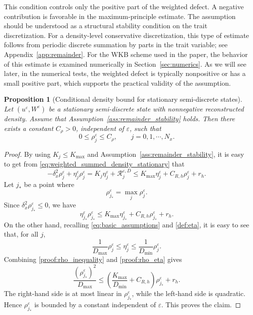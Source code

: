 \documentclass[11pt]{article}
\newtheorem{proposition}{Proposition}[section]
\begin{document}
This condition controls only the positive part of the weighted defect.  A
negative contribution is favorable in the maximum-principle estimate.  The
assumption should be understood as a structural stability condition on the trait
discretization.  For a density-level conservative discretization, this type of
estimate follows from periodic discrete summation by parts in the trait
variable; see Appendix~\ref{app:remainder}.  
For the WKB scheme used in the paper,  the behavior of this estimate is examined numerically in
Section~\ref{sec:numerics}.  
As we will see later, in the numerical tests, the weighted defect is
typically nonpositive or has a small positive part, which supports the practical
validity of the assumption.



\begin{proposition}[Conditional density bound for stationary semi-discrete states]
\label{prop:uniform_bound_stationary_mass}
Let \((u^\varepsilon,W^\varepsilon)\) be a stationary semi-discrete state with
nonnegative reconstructed density.  Assume that
Assumption~\ref{ass:remainder_stability} holds.  Then there exists a constant
\(C_\rho>0\), independent of \(\varepsilon\), such that
\[
    0\le \rho_j^\varepsilon\le C_\rho,
    \qquad j=0, 1,\cdots, N_x .
\]
\end{proposition}

\begin{proof}
By using  \(K_j\le K_{\max}\) and Assumption~\ref{ass:remainder_stability}, it is easy to get from \eqref{eq:weighted_summed_density_stationary} that 
\[
    -\delta_x^2\rho_j^\varepsilon
    +
    \eta_j^\varepsilon\rho_j^\varepsilon
    =
    K_j  \eta_j^\varepsilon
    +
    \mathcal R_j^{\varepsilon,D}
    \le
    K_{\max}\eta_j^\varepsilon
    +
    C_{R,h}\rho_j^\varepsilon
    +
    r_h .
\] 
Let \(j_*\) be a point where
\[
    \rho_{j_*}^\varepsilon = \max_j \rho_j^\varepsilon.
\]
Since \(\delta_x^2\rho_{j_*}^\varepsilon\le0\), we have
\begin{equation}\label{proof:rho_inequality}
    \eta_{j_*}^\varepsilon \rho_{j_*}^\varepsilon
    \le
    K_{\max}\eta_{j_*}^\varepsilon
    +
    C_{R,h}\rho_{j_*}^\varepsilon
    +
    r_h .
\end{equation}
On the other hand, recalling \eqref{eq:basic_assumptions} and \eqref{def:eta}, it is easy to see that, for all $j$, 
\begin{equation}\label{proof:rho_eta}
    \frac1{D_{\max}}\rho_j^\varepsilon
    \le
    \eta_j^\varepsilon
    \le
    \frac1{D_{\min}}\rho_j^\varepsilon .
\end{equation}
Combining \eqref{proof:rho_inequality} and \eqref{proof:rho_eta} gives
\[
    \frac{(\rho_{j_*}^\varepsilon)^2}{D_{\max}}
    \le
    \left(
        \frac{K_{\max}}{D_{\min}}+C_{R,h}
    \right)\rho_{j_*}^\varepsilon
    +
    r_h .
\]
The right-hand side is at most linear in \(\rho_{j_*}^\varepsilon\), while the left-hand
side is quadratic.  Hence \(\rho_{j_*}^\varepsilon\) is bounded by a constant independent
of \(\varepsilon\).  This proves the claim.
\end{proof}
\end{document}
